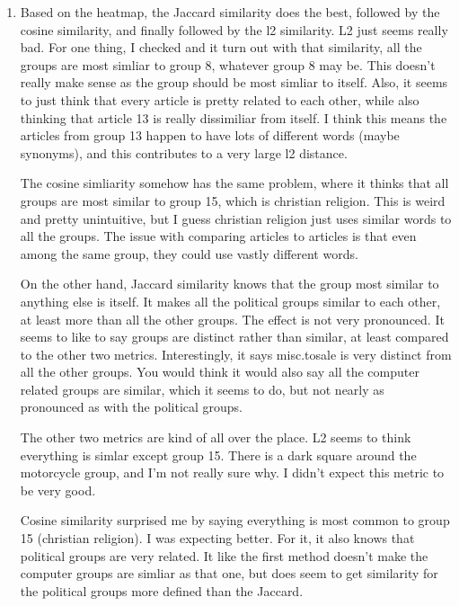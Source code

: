 \documentclass[12pt]{article}
\theoremstyle{definitionstyle}
\begin{document}
\begin{enumerate}[leftmargin=\labelsep]
\begin{enumerate}
\begin{figure}[H]
            \end{figure}
            \item Based on the heatmap, the Jaccard similarity does the best, followed by the cosine similarity, and finally followed by the l2 similarity. L2 just seems really bad. For one thing, I checked and it turn out with that similarity, all the groups are most simliar to group 8, whatever group 8 may be. This doesn't really make sense as the group should be most simliar to itself. Also, it seems to just think that every article is pretty related to each other, while also thinking that article 13 is really dissimiliar from itself. I think this means the articles from group 13 happen to have lots of different words (maybe synonyms), and this contributes to a very large l2 distance. 

            The cosine simliarity somehow has the same problem, where it thinks that all groups are most similar to group 15, which is christian religion. This is weird and pretty unintuitive, but I guess christian religion just uses similar words to all the groups. The issue with comparing articles to articles is that even among the same group, they could use vastly different words. 

            On the other hand, Jaccard similarity knows that the group most similar to anything else is itself. It makes all the political groups similar to each other, at least more than all the other groups. The effect is not very pronounced. It seems to like to say groups are distinct rather than similar, at least compared to the other two metrics. Interestingly, it says misc.tosale is very distinct from all the other groups. You would think it would also say all the computer related groups are similar, which it seems to do, but not nearly as pronounced as with the political groups.

            The other two metrics are kind of all over the place. L2 seems to think everything is simlar except group 15. There is a dark square around the motorcycle group, and I'm not really sure why. I didn't expect this metric to be very good.

            Cosine similarity surprised me by saying everything is most common to group 15 (christian religion). I was expecting better. For it, it also knows that political groups are very related. It like the first method doesn't make the computer groups are simliar as that one, but does seem to get similarity for the political groups more defined than the Jaccard.


\end{enumerate}
\end{enumerate}
\end{document}
